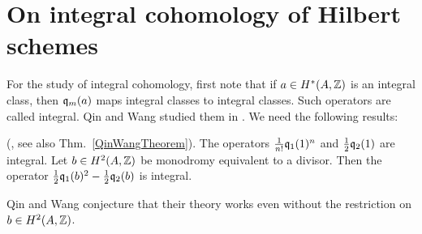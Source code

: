 

\section{On integral cohomology of Hilbert schemes}\label{basisHilb2}

For the study of integral cohomology, first note that if $a \in H^*(A,\mathbb{Z})$ is an integral class, then $\mathfrak{q}_{m}(a) $ maps integral classes to integral classes. Such operators are called integral. Qin and Wang studied them in \cite{QinWang}. We need the following results:

\begin{lemma} (\cite{QinWang}\label{IntegralOperators}, see also Thm.~\ref{QinWangTheorem}).
The operators $\frac{1}{n!}\mathfrak{q}_1(1)^n$ and $\frac{1}{2}\mathfrak{q}_2(1) $ are integral.
Let $b\in H^2(A,\mathbb{Z})$ be monodromy equivalent to a divisor. Then the operator $\frac{1}{2}\mathfrak{q}_1(b)^2 - \frac{1}{2}\mathfrak{q}_2(b)$ is integral. 
\end{lemma}
\begin{remark}
Qin and Wang \cite[Thm 1.1 et seq.]{QinWang} conjecture that their theory works even without the restriction on $b\in H^2(A,\mathbb{Z})$. 
\end{remark}

